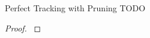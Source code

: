 \begin{theorem}{Perfect Tracking with Pruning TODO}
\label{thm:perfect-tracking-with-pruning-todo}

\end{theorem}

\begin{proof}
\label{prf:perfect-tracking-with-pruning-todo}

\end{proof}
